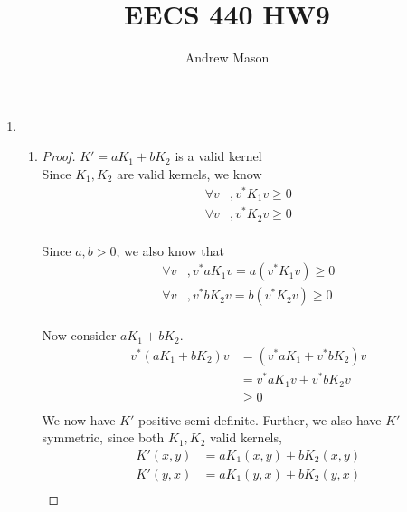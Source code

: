 \documentclass[12pt]{article}
\title{EECS 440 HW9}
\author{Andrew Mason}
\begin{document}
\maketitle

\begin{enumerate}
    \item
        \begin{enumerate}
            \item
                \begin{proof} $K'=aK_1+bK_2$ is a valid kernel\\
                    Since $K_1,K_2$ are valid kernels, we know
                    \begin{equation}
                        \begin{split}
                            \forall v&,v^*K_1v\geq0\\
                            \forall v&,v^*K_2v\geq0\\
                        \end{split}
                    \end{equation}

                    Since $a,b>0$, we also know that
                    \begin{equation}
                        \begin{split}
                            \forall v&,v^*aK_1v=a\left(v^*K_1v\right)\geq0\\
                            \forall v&,v^*bK_2v=b\left(v^*K_2v\right)\geq0\\
                        \end{split}
                    \end{equation}

                    Now consider $aK_1+bK_2$.
                    \begin{equation}
                        \begin{split}
                            v^*\left(aK_1+bK_2\right)v&=\left(v^*aK_1+v^*bK_2\right)v\\
                            &=v^*aK_1v+v^*bK_2v\\
                            &\geq0\\
                        \end{split}
                    \end{equation}
                    We now have $K'$ positive semi-definite. Further, we also
                    have $K'$ symmetric, since both $K_1,K_2$ valid kernels,
                    \begin{equation}
                        \begin{split}
                            K'(x,y)&=aK_1(x,y)+bK_2(x,y)\\
                            K'(y,x)&=aK_1(y,x)+bK_2(y,x)\\
                        \end{split}
                    \end{equation}


\end{proof}
\end{enumerate}
\end{enumerate}
\end{document}

